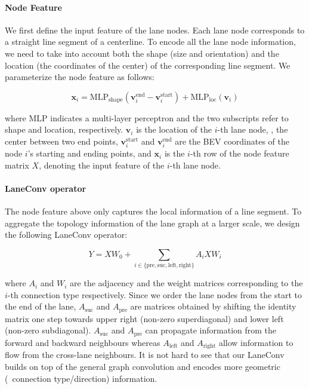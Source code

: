 \paragraph{Node Feature}
\label{par:7_improving_efficiency_node_feature}

We first define the input feature of the lane nodes. Each lane node corresponds to a straight line segment of a centerline. To encode  all the lane node information, we need to take into account both the shape (size and orientation) and the location (the coordinates of the center) of the corresponding line segment. We parameterize the node feature as follows:

\begin{equation}
	\mathbf{x}_i = \text{MLP}_\text{shape} \left( \mathbf{v}_i^{\text{end}} - \mathbf{v}_i^{\text{start}} \right)
	+ \text{MLP}_{\text{loc}}\left(\textbf{v}_i\right)
	\label{eqn:node_feat}
\end{equation}

where $\text{MLP}$ indicates a multi-layer perceptron and the two subscripts refer to shape and location, respectively.  $\textbf{v}_i$ is the location of the $i$-th lane node, \ie, the center between two end points, $\mathbf{v}_i^{\text{start}}$ and $\mathbf{v}_i^{\text{end}}$ are the BEV coordinates of the node $i$'s starting and ending points, and $\mathbf{x}_i$ is the $i$-th row of the node feature matrix $X$, denoting the input feature of the $i$-th lane node.

\paragraph{LaneConv operator}
\label{par:7_improving_efficiency_lane_conv}

The node feature above only captures the local information of a line segment. To aggregate the topology information of the lane graph at a larger scale, we design the following LaneConv operator:

\begin{equation}
	Y = X W_0 + \sum_{i \in \{ \text{pre}, \text{suc}, \text{left}, \text{right} \}} {A_{i} X W_{i}}
	\label{eqn:laneconv}
\end{equation}

where $A_{i}$ and $W_i$ are the adjacency  and the weight matrices corresponding to the $i$-th connection type respectively. Since we order the lane nodes from the start to the end of the lane, $A_{\text{suc}}$ and $A_{\text{pre}}$ are matrices obtained by shifting the identity matrix one step towards upper right (non-zero superdiagonal) and lower left (non-zero subdiagonal). $A_{\text{suc}}$ and $A_{\text{pre}}$ can propagate information from the forward and backward neighbours whereas $A_{\text{left}}$ and $A_{\text{right}}$ allow information to flow from the cross-lane neighbours. It is not hard to see that our LaneConv builds on top of the general graph convolution and encodes more geometric (\eg \ connection type/direction) information.

